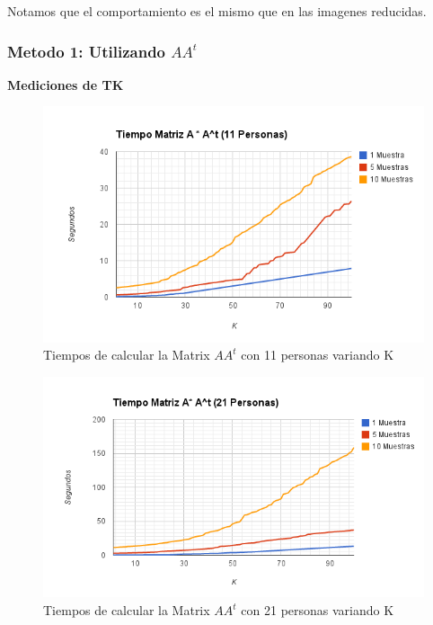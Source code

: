 Notamos que el comportamiento es el mismo que en las imagenes reducidas.


\subsubsection{Metodo 1: Utilizando $AA^t$}

\textbf{Mediciones de TK}

\begin{figure}[H]
\includegraphics[width=1\textwidth]{img/imagef1.png}
     \caption{Tiempos de calcular la Matrix $AA^t$ con 11 personas variando K}
\end{figure}

\begin{figure}[H]
\includegraphics[width=1\textwidth]{img/imagef2.png}
     \caption{Tiempos de calcular la Matrix $AA^t$ con 21 personas variando K}
\end{figure}

